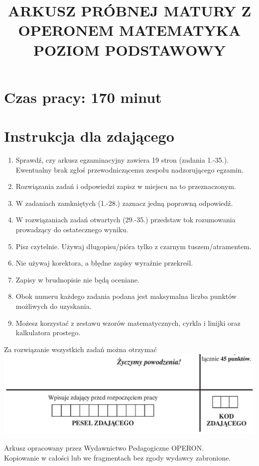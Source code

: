 \documentclass[10pt]{article}
\title{ARKUSZ PRÓBNEJ MATURY Z OPERONEM MATEMATYKA \\
 POZIOM PODSTAWOWY }
\author{}
\date{}
\begin{document}
\maketitle
\section*{Czas pracy: 170 minut}
\section*{Instrukcja dla zdającego}
\begin{enumerate}
  \item Sprawdź, czy arkusz egzaminacyjny zawiera 19 stron (zadania 1.-35.). Ewentualny brak zgłoś przewodniczącemu zespołu nadzorującego egzamin.
  \item Rozwiązania zadań i odpowiedzi zapisz w miejscu na to przeznaczonym.
  \item W zadaniach zamkniętych (1.-28.) zaznacz jedną poprawną odpowiedź.
  \item W rozwiązaniach zadań otwartych (29.-35.) przedstaw tok rozumowania prowadzący do ostatecznego wyniku.
  \item Pisz czytelnie. Używaj długopisu/pióra tylko z czarnym tuszem/atramentem.
  \item Nie używaj korektora, a błędne zapisy wyraźnie przekreśl.
  \item Zapisy w brudnopisie nie będą oceniane.
  \item Obok numeru każdego zadania podana jest maksymalna liczba punktów możliwych do uzyskania.
  \item Możesz korzystać z zestawu wzorów matematycznych, cyrkla i linijki oraz kalkulatora prostego.
\end{enumerate}

Za rozwiązanie wszystkich zadań można otrzymać\\
\includegraphics[max width=\textwidth, center]{2024_11_21_cdea326d19d0c2132b88g-01}

Arkusz opracowany przez Wydawnictwo Pedagogiczne OPERON.\\
Kopiowanie w całości lub we fragmentach bez zgody wydawcy zabronione.
\end{document}
